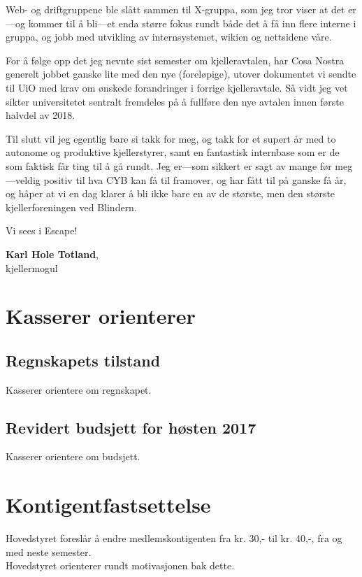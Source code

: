\documentclass[10pt,norsk,a4paper]{article}
\begin{document}
\begin{multicols}{2}
	Web- og driftgruppene ble slått sammen til X-gruppa, som jeg tror viser at det er---og kommer til å bli---et enda større fokus rundt både det å få inn flere interne i gruppa, og jobb med utvikling av internsystemet, wikien og nettsidene våre.

	For å følge opp det jeg nevnte sist semester om kjelleravtalen, har Cosa Nostra generelt jobbet ganske lite med den nye (foreløpige), utover dokumentet vi sendte til UiO med krav om ønskede forandringer i forrige kjelleravtale. Så vidt jeg vet sikter universitetet sentralt fremdeles på å fullføre den nye avtalen innen første halvdel av 2018.

	Til slutt vil jeg egentlig bare si takk for meg, og takk for et supert år med to autonome og produktive kjellerstyrer, samt en fantastisk internbase som er de som faktisk får ting til å gå rundt. Jeg er---som sikkert er sagt av mange før meg---veldig positiv til hva CYB kan få til framover, og har fått til på ganske få år, og håper at vi en dag klarer å bli ikke bare en av de største, men den største kjellerforeningen ved Blindern.

	Vi sees i Escape!

	\textbf{Karl Hole Totland}, \\
	kjellermogul \\
	\date{14.\ november 2017}
\end{multicols}


\section{Kasserer orienterer}
\subsection{Regnskapets tilstand}
Kasserer orientere om regnskapet.


\subsection{Revidert budsjett for høsten 2017}
Kasserer orientere om budsjett.



\section{Kontigentfastsettelse}
Hovedstyret foreslår å endre medlemskontigenten fra kr. 30,- til kr. 40,-,
fra og med neste semester. \\
Hovedstyret orienterer rundt motivasjonen bak dette.
\end{document}
